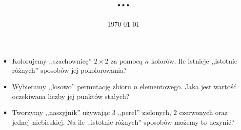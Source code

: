 \documentclass{beamer}
\begin{document}
 
\title[Zliczanie orbit grupy]{
  ...
} 
\author{} 
\date{\today}
\begin{frame} 
  \titlepage 
\end{frame} 
\begin{frame}
\begin{itemize}

\item<1->{
Kolorujemy ,,szachownicę'' $2 \times 2$ za pomocą $n$ kolorów.
Ile istnieje ,,istotnie różnych'' sposobów jej pokolorowania?
}
\item<2->{
Wybieramy ,,losowo'' permutację zbioru $n$ elementowego.
Jaka jest wartość oczekiwana liczby jej punktów stałych?
}
\item<3->{
Tworzymy ,,naszyjnik'' używając $3$ ,,pereł'' zielonych, $2$ czerwonych oraz jednej niebieskiej.
Na ile ,,istotnie różnych'' sposobów możemy to uczynić?
}
\end{itemize}
\end{frame}
\end{document}
